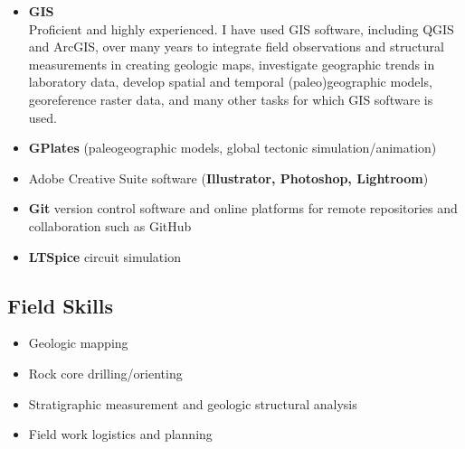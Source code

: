 \documentclass[11pt,letterpaper,sans]{moderncv}
\begin{document}
\begin{itemize}[itemsep=-3pt]
    \item \textbf{GIS}\\ 
        Proficient and highly experienced. I have used GIS software, including
        QGIS and ArcGIS, over many years to integrate field observations and
        structural measurements in creating geologic maps, investigate
        geographic trends in laboratory data, develop spatial and temporal
        (paleo)geographic models, georeference raster data, and many other tasks
        for which GIS software is used.
        
    \item \textbf{GPlates} (paleogeographic models, global tectonic simulation/animation)
        
    \item Adobe Creative Suite software (\textbf{Illustrator,
        Photoshop, Lightroom})
 \item \textbf{Git} version control software and online platforms for
     remote repositories and collaboration such as GitHub
   \item \textbf{LTSpice} circuit simulation
\end{itemize}

\subsection{Field Skills}

\begin{itemize}
 \item Geologic mapping
 \item Rock core drilling/orienting
 \item Stratigraphic measurement and geologic structural analysis
 \item Field work logistics and planning
\end{itemize}


\end{document}
